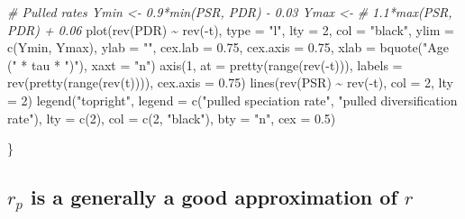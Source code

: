 \documentclass[
]{article}
\newenvironment{Shaded}{\begin{snugshade}}{\end{snugshade}}
\newcommand{\AttributeTok}[1]{\textcolor[rgb]{0.77,0.63,0.00}{#1}}
\newcommand{\CommentTok}[1]{\textcolor[rgb]{0.56,0.35,0.01}{\textit{#1}}}
\newcommand{\DecValTok}[1]{\textcolor[rgb]{0.00,0.00,0.81}{#1}}
\newcommand{\FloatTok}[1]{\textcolor[rgb]{0.00,0.00,0.81}{#1}}
\newcommand{\FunctionTok}[1]{\textcolor[rgb]{0.00,0.00,0.00}{#1}}
\newcommand{\NormalTok}[1]{#1}
\newcommand{\SpecialCharTok}[1]{\textcolor[rgb]{0.00,0.00,0.00}{#1}}
\newcommand{\StringTok}[1]{\textcolor[rgb]{0.31,0.60,0.02}{#1}}
\begin{document}
\begin{Shaded}
\begin{Highlighting}[]
    \CommentTok{\# Pulled rates Ymin \textless{}{-} 0.9*min(PSR, PDR) {-} 0.03 Ymax \textless{}{-}}
    \CommentTok{\# 1.1*max(PSR, PDR) + 0.06}
    \FunctionTok{plot}\NormalTok{(}\FunctionTok{rev}\NormalTok{(PDR) }\SpecialCharTok{\textasciitilde{}} \FunctionTok{rev}\NormalTok{(}\SpecialCharTok{{-}}\NormalTok{t), }\AttributeTok{type =} \StringTok{"l"}\NormalTok{, }\AttributeTok{lty =} \DecValTok{2}\NormalTok{, }\AttributeTok{col =} \StringTok{"black"}\NormalTok{,}
        \AttributeTok{ylim =} \FunctionTok{c}\NormalTok{(Ymin, Ymax), }\AttributeTok{ylab =} \StringTok{""}\NormalTok{, }\AttributeTok{cex.lab =} \FloatTok{0.75}\NormalTok{, }\AttributeTok{cex.axis =} \FloatTok{0.75}\NormalTok{,}
        \AttributeTok{xlab =} \FunctionTok{bquote}\NormalTok{(}\StringTok{"Age ("} \SpecialCharTok{*}\NormalTok{ tau }\SpecialCharTok{*} \StringTok{")"}\NormalTok{), }\AttributeTok{xaxt =} \StringTok{"n"}\NormalTok{)}
    \FunctionTok{axis}\NormalTok{(}\DecValTok{1}\NormalTok{, }\AttributeTok{at =} \FunctionTok{pretty}\NormalTok{(}\FunctionTok{range}\NormalTok{(}\FunctionTok{rev}\NormalTok{(}\SpecialCharTok{{-}}\NormalTok{t))), }\AttributeTok{labels =} \FunctionTok{rev}\NormalTok{(}\FunctionTok{pretty}\NormalTok{(}\FunctionTok{range}\NormalTok{(}\FunctionTok{rev}\NormalTok{(t)))),}
        \AttributeTok{cex.axis =} \FloatTok{0.75}\NormalTok{)}
    \FunctionTok{lines}\NormalTok{(}\FunctionTok{rev}\NormalTok{(PSR) }\SpecialCharTok{\textasciitilde{}} \FunctionTok{rev}\NormalTok{(}\SpecialCharTok{{-}}\NormalTok{t), }\AttributeTok{col =} \DecValTok{2}\NormalTok{, }\AttributeTok{lty =} \DecValTok{2}\NormalTok{)}
    \FunctionTok{legend}\NormalTok{(}\StringTok{"topright"}\NormalTok{, }\AttributeTok{legend =} \FunctionTok{c}\NormalTok{(}\StringTok{"pulled speciation rate"}\NormalTok{, }\StringTok{"pulled diversification rate"}\NormalTok{),}
        \AttributeTok{lty =} \FunctionTok{c}\NormalTok{(}\DecValTok{2}\NormalTok{), }\AttributeTok{col =} \FunctionTok{c}\NormalTok{(}\DecValTok{2}\NormalTok{, }\StringTok{"black"}\NormalTok{), }\AttributeTok{bty =} \StringTok{"n"}\NormalTok{, }\AttributeTok{cex =} \FloatTok{0.5}\NormalTok{)}

\NormalTok{\}}
\end{Highlighting}
\end{Shaded}

\pagebreak

\hypertarget{r_p-is-a-generally-a-good-approximation-of-r}{%
\subsection{\texorpdfstring{\(r_p\) is a generally a good approximation
of
\(r\)}{r\_p is a generally a good approximation of r}}\label{r_p-is-a-generally-a-good-approximation-of-r}}
\end{document}
